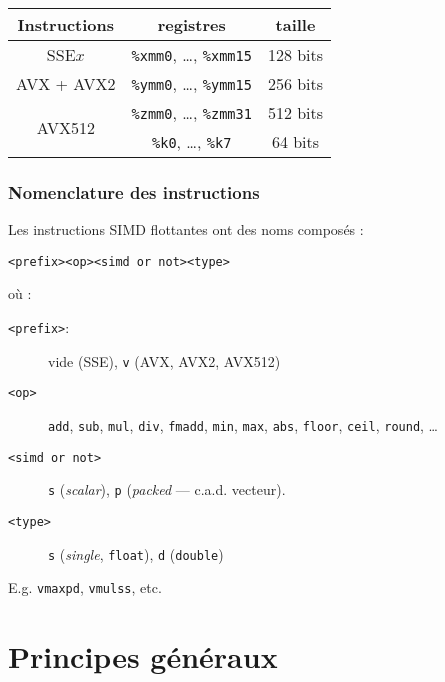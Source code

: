 \documentclass[xcolor={x11names,svgnames}]{beamer}
\begin{document}
\begin{frame}
\begin{center}
  \bigskip
  
\begin{tabular}{|c|c|c|}
  \hline
  Instructions & registres & taille \\
  \hline\hline
  SSE$x$              & \texttt{\%xmm0}, \dots, \texttt{\%xmm15} & 128 bits \\
  \hline
  AVX + AVX2          & \texttt{\%ymm0}, \dots, \texttt{\%ymm15} & 256 bits \\
  \hline
  \multirow{2}{*}{AVX512} & \texttt{\%zmm0}, \dots, \texttt{\%zmm31} & 512 bits \\
               & \texttt{\%k0}, \dots, \texttt{\%k7}      & 64 bits \\
  \hline
  \end{tabular}
\end{center}
\end{frame}


\begin{frame}[fragile=singleslide]
  \frametitle{Nomenclature des instructions}
  
Les instructions SIMD flottantes ont des noms
composés :
\begin{center}
  \verb|<prefix><op><simd or not><type>|
\end{center}
où :
\begin{description}
\item[\texttt{<prefix>}:] vide (SSE), \texttt{v} (AVX, AVX2, AVX512)
\item[\texttt{<op>}] \texttt{add}, \texttt{sub}, \texttt{mul}, \texttt{div}, \texttt{fmadd}, \texttt{min}, \texttt{max}, \texttt{abs}, \texttt{floor}, \texttt{ceil}, \texttt{round}, \dots
\item[\texttt{<simd or not>}] \texttt{s} (\textit{scalar}), \texttt{p} (\textit{packed} --- c.a.d. vecteur).
\item[\texttt{<type>}] \texttt{s} (\textit{single}, \texttt{float}), \texttt{d} (\texttt{double})
\end{description}

\bigskip

E.g. \texttt{vmaxpd}, \texttt{vmulss}, etc.

\end{frame}


\section{Principes généraux}
\end{document}
